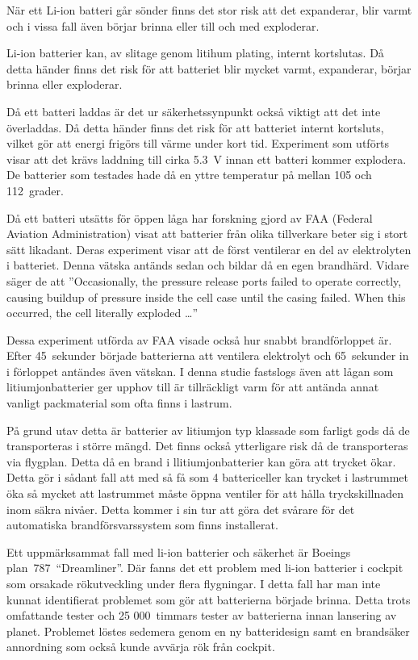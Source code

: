\documentclass[a4paper,12pt]{article}
\begin{document}
När ett Li-ion batteri går sönder finns det stor risk att det expanderar, blir varmt och i vissa fall även börjar brinna eller till och med exploderar.

Li-ion batterier kan, av slitage genom litihum plating, internt kortslutas.\cite{nasa} Då detta händer finns det risk för att batteriet blir mycket varmt, expanderar, börjar brinna eller exploderar.

Då ett batteri laddas är det ur säkerhetssynpunkt också viktigt att det inte överladdas. Då detta händer finns det risk för att batteriet internt kortsluts, vilket gör att energi frigörs till värme under kort tid. Experiment som utförts \cite{overcharging} visar att det krävs laddning till cirka 5.3~V innan ett batteri kommer explodera. De batterier som testades hade då en yttre temperatur på mellan 105 och 112~grader.

Då ett batteri utsätts för öppen låga har forskning gjord av FAA (Federal Aviation Administration) \cite{fire-faa} visat att batterier från olika tillverkare beter sig i stort sätt likadant. Deras experiment visar att de först ventilerar en del av elektrolyten i batteriet. Denna vätska antänds sedan och bildar då en egen brandhärd. Vidare säger de att ''Occasionally, the pressure release ports failed to operate correctly, causing buildup of pressure inside the cell case until the casing failed. When this occurred, the cell literally exploded …''

Dessa experiment utförda av FAA visade också hur snabbt brandförloppet är. Efter 45~sekunder började batterierna att ventilera elektrolyt och 65~sekunder in i förloppet antändes även vätskan. I denna studie fastslogs även att lågan som litiumjonbatterier ger upphov till är tillräckligt varm för att antända annat vanligt packmaterial som ofta finns i lastrum.\cite{fire-faa}

På grund utav detta är batterier av litiumjon typ klassade som farligt gods då de transporteras i större mängd. Det finns också ytterligare risk då de transporteras via flygplan. Detta då en brand i llitiumjonbatterier kan göra att trycket ökar. Detta gör i sådant fall att med så få som 4 battericeller kan trycket i lastrummet öka så mycket att lastrummet måste öppna ventiler för att hålla tryckskillnaden inom säkra nivåer. Detta kommer i sin tur att göra det svårare för det automatiska brandförsvarssystem som finns installerat.\cite{fire-faa}

Ett uppmärksammat fall med li-ion batterier och säkerhet är Boeings plan~787~“Dreamliner”. Där fanns det ett problem med li-ion batterier i cockpit som orsakade rökutveckling under flera flygningar. I detta fall har man inte kunnat identifierat problemet som gör att batterierna började brinna. Detta trots omfattande tester och 25 000~timmars tester av batterierna innan lansering av planet. Problemet löstes sedemera genom en ny batteridesign samt en brandsäker annordning som också kunde avvärja rök från cockpit.\cite{dreamliner}
\end{document}
